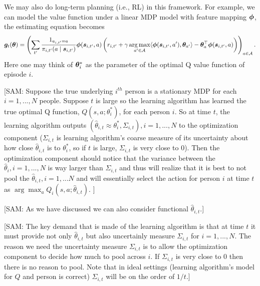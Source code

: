 \documentclass{article}
\newcommand{\sam}[1]{
  {\color{blue} [SAM: {#1}]}
 }
\begin{document}
We may also do long-term planning (i.e., RL) in this framework. For example, we can model the value function under a linear MDP model with feature mapping ${\bm{\phi}}$, the estimating equation becomes
$$
    {\bm{g}}_t({\bm{\theta}}) = \left( \sum_{t'} \frac{1_{a_{i, t'} = a}}{\pi_{i, t'}(a \mid {\bm{s}}_{i, t'})}{\bm{\phi}}({\bm{s}}_{i, t'}, a) \left(r_{i, t'} + \gamma \operatorname*{arg\,max}_{a' \in {\mathcal{A}}} \langle {\bm{\phi}}({\bm{s}}_{i, t'}, a'), {\bm{\theta}}_{a'}\rangle - {\bm{\theta}}_{a}^{\top} {\bm{\phi}}({\bm{s}}_{i, t'}, a)\right) \right)_{a \in {\mathcal{A}}}.
$$
Here one may think of ${\bm{\theta}}_i^*$ as the parameter of the optimal Q value function of episode $i$.   
\sam{ Suppose the true underlying $i^{th}$ person is a stationary MDP for each $i=1,...,N$ people.  Suppose $t$ is large so the learning algorithm has learned the true optimal Q function, $Q(s,a;\theta_i^*)$, for each person $i$.  So at time $t$, the learning algorithm outputs $(\hat\theta_{i,t}\approx\theta_i^*,  \Sigma_{i,t}), i=1,...,N$ to the optimization component ($\Sigma_{i,t}$ is learning algorithm's coarse measure of its uncertainty about how close $\hat\theta_{i,t}$ is to $\theta_i^*$, so if $t$ is large, $\Sigma_{i,t}$ is very close to 0).  Then the  optimization component should notice that the variance between the $\hat\theta_i, i=1,...,N$ is way larger than $\Sigma_{i,t}$ and thus will realize that it is best to not pool the $\hat\theta_{i,t}, i=1,...N$ and will essentially select the action  for person $i$ at time $t$ as $\arg\max_a Q_i(s,a;\hat\theta_{i,t})$. }

\sam{As we have discussed we can also consider functional $\hat\theta_{i,t}$.}

\sam{The key demand that is made of the learning algorithm is that at time $t$ it must provide not only $\hat\theta_{i,t}$  but also uncertainly measure $  \Sigma_{i,t}$  for  $ i=1,...,N$.    The reason we need the uncertainty measure $  \Sigma_{i,t}$ is to allow the optimization component to decide how much to pool across $i$. If  $  \Sigma_{i,t}$ is very close to $0$ then there is no reason to pool.   Note that in ideal settings (learning algorithm's model for $Q$ and person is correct) $  \Sigma_{i,t}$ will be on the order of $1/t$.}
\end{document}
